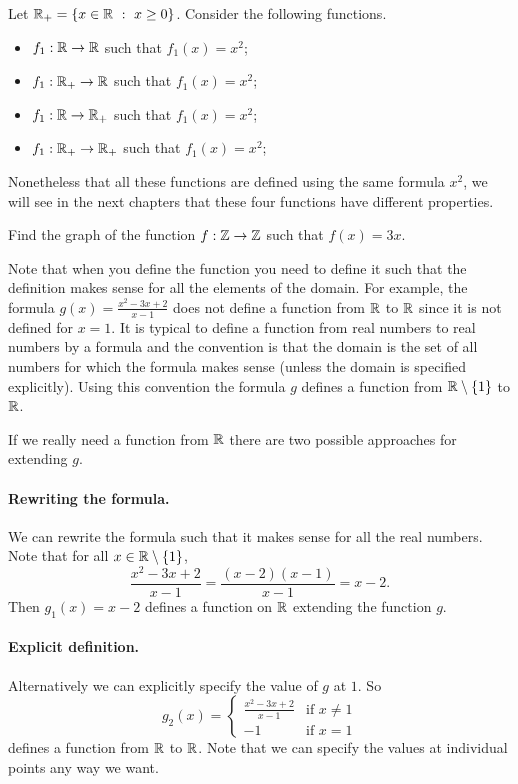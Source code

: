 Let $\R_+ = \set[x \ge 0]{x \in \R}$. Consider the following functions.
\begin{itemize}
  \item $f_1 : \mathbb{R} \to \mathbb{R}$ such that $f_1(x) = x^2$;
  \item $f_1 : \mathbb{R}_+ \to \mathbb{R}$ such that $f_1(x) = x^2$;
  \item $f_1 : \mathbb{R} \to \mathbb{R}_+$ such that $f_1(x) = x^2$;
  \item $f_1 : \mathbb{R}_+ \to \mathbb{R}_+$ such that $f_1(x) = x^2$;
\end{itemize}
Nonetheless that all these functions are defined using the same formula $x^2$,
we will see in the next chapters that these four functions have different
properties.

\begin{exercise}
  Find the graph of the function $f : \mathbb{Z} \to \mathbb{Z}$ such that $f(x) = 3x$.
\end{exercise}

Note that when you define the function you need to define it such that the
definition makes sense for all the elements of the domain. For example, the
formula $g(x) = \frac{x^2 - 3x + 2}{x - 1}$ does not define a function from
$\mathbb{R}$ to $\mathbb{R}$ since it is not defined for $x = 1$. It is typical to define a
function from real numbers to real numbers by a formula and the convention is
that the domain is the set of all numbers for which the formula makes sense
(unless the domain is specified explicitly).
Using this convention the formula $g$ defines a function from $\R \setminus
\set{1}$ to $\mathbb{R}$.

If we really need a function from $\mathbb{R}$ there are two possible approaches for
extending $g$.

\paragraph{Rewriting the formula.}
We can rewrite the formula such that it makes sense for all the real numbers.
Note that for all $x \in \R \setminus \set{1}$,
\[
  \frac{x^2 - 3x + 2}{x - 1} = \frac{(x - 2)(x - 1)}{x - 1} = x - 2.
\]
Then $g_1(x) = x - 2$ defines a function on $\mathbb{R}$ extending the function $g$.

\paragraph{Explicit definition.} Alternatively we can explicitly specify the
value of $g$ at $1$. So
\[
  g_2(x) =
  \begin{cases}
    \frac{x^2 - 3x + 2}{x - 1} & \text{if } x \neq 1 \\
    -1 & \text{if } x = 1
  \end{cases}
\]
defines a function from $\mathbb{R}$ to $\mathbb{R}$. Note that we can specify the values at
individual points any way we want.

